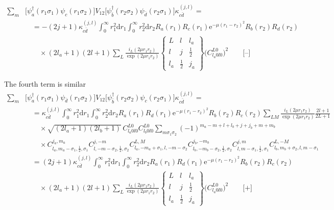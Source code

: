 \documentclass[10pt,a4paper]{article}
\begin{document}
\begin{align}
\sum_m &\big[\psi_a^\dagger(r_1\sigma_1)\psi_c(r_1\sigma_2)\big]V_{12}
\big[\psi_{\bar{b}}^\dagger(r_2\sigma_2)\psi_{\bar{d}}(r_2\sigma_1)\big]
\kappa_{c\bar{d}}^{(j,l)} = \nonumber\\
&\quad =-(2j+1)\kappa_{c\bar{d}}^{(j,l)} \int_0^\infty r_1^2\mathrm{d}r_1
\int_0^\infty r_2^2\mathrm{d}r_2 R_a(r_1) R_c(r_1) \mathrm{e}^{-\mu(r_1-r_2)^2}
R_b(r_2) R_d(r_2) \nonumber\\
&\qquad\times (2l_a+1)(2l+1) \sum_L\frac{i_L(2\mu r_1 r_2)}{\exp(2\mu r_1 r_2)}
\begin{Bmatrix} L & l & l_a \\ l & j & \frac{1}{2} \\
l_a & \frac{1}{2} & j_a \end{Bmatrix}
\Big(C_{l_a 0 l 0}^{L0}\Big)^2 \qquad \textbf{[--]}
\end{align}

The fourth term is similar
\begin{align}
\sum_m &\big[\psi_a^\dagger(r_1\sigma_1)\psi_{\bar{d}}(r_1\sigma_2)\big]V_{12}
\big[\psi_{\bar{b}}^\dagger(r_2\sigma_2)\psi_c(r_2\sigma_1)\big]
\kappa_{c\bar{d}}^{(j,l)} = \nonumber\\
&\quad =\kappa_{c\bar{d}}^{(j,l)} \int_0^\infty r_1^2\mathrm{d}r_1
\int_0^\infty r_2^2\mathrm{d}r_2 R_a(r_1) R_d(r_1) \mathrm{e}^{-\mu(r_1-r_2)^2}
R_b(r_2) R_c(r_2) \sum_{LM}\frac{i_L(2\mu r_1 r_2)}{\exp(2\mu r_1 r_2)}
\frac{2l+1}{2L+1} \nonumber\\
&\qquad\times\sqrt{(2l_a+1)(2l_b+1)}\,
C_{l_a 0 l 0}^{L0} C_{l_b 0 l 0}^{L0} \sum_{m\sigma_1\sigma_2}
(-1)^{m_a-m+l+l_b+j+j_b+m+m_b} \nonumber\\
&\qquad\times C_{l_a,m_a-\sigma_1,\frac{1}{2},\sigma_1}^{j_a,m_a}
C_{l,-m-\sigma_2,\frac{1}{2},\sigma_2}^{j,-m}
C_{l_a,-m_a+\sigma_1,l,-m-\sigma_2}^{L,M}
C_{l_b,-m_b-\sigma_2,\frac{1}{2},\sigma_2}^{j_b,-m_b}
C_{l,m-\sigma_1,\frac{1}{2},\sigma_1}^{j,m}
C_{l_b,m_b+\sigma_2,l,m-\sigma_1}^{L,-M} \nonumber\\
&\quad =(2j+1)\kappa_{c\bar{d}}^{(j,l)} \int_0^\infty r_1^2\mathrm{d}r_1
\int_0^\infty r_2^2\mathrm{d}r_2 R_a(r_1) R_d(r_1) \mathrm{e}^{-\mu(r_1-r_2)^2}
R_b(r_2) R_c(r_2) \nonumber\\
&\qquad\times (2l_a+1)(2l+1) \sum_L\frac{i_L(2\mu r_1 r_2)}{\exp(2\mu r_1 r_2)}
\begin{Bmatrix} L & l & l_a \\ l & j & \frac{1}{2} \\
l_a & \frac{1}{2} & j_a \end{Bmatrix}
\Big(C_{l_a 0 l 0}^{L0}\Big)^2 \qquad \textbf{[+]}
\end{align}
\end{document}
